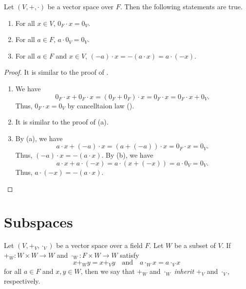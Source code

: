 \begin{theorem}\label{thm:vector-space-multiplication}
  Let $(V, +, \cdot)$ be a vector space over $F$.
  Then the following statements are true.
  \begin{enumerate}
    \item For all $x \in V$, $0_F \cdot x = 0_V$.
    \item For all $a \in F$, $a \cdot 0_V = 0_V$.
    \item For all $a \in F$ and $x \in V$,
      $(-a) \cdot x = -(a \cdot x) = a \cdot (-x)$.
  \end{enumerate}
\end{theorem}
\begin{proof}
  It is similar to the proof of .
  \begin{enumerate}
    \item We have
      $$
      0_F \cdot x + 0_F \cdot x
      = (0_F + 0_F) \cdot x
      = 0_F \cdot x
      = 0_F \cdot x + 0_V.
      $$
      Thus, $0_F \cdot x = 0_V$ by cancelltaion law
      ().
    \item It is similar to the proof of (a).
    \item By (a), we have
      $$
      a \cdot x + (-a) \cdot x
      = (a + (-a)) \cdot x
      = 0_F \cdot x
      = 0_V.
      $$
      Thus, $(-a) \cdot x = -(a \cdot x)$.
      By (b), we have
      $$
      a \cdot x + a \cdot (-x)
      = a \cdot (x + (-x))
      = a \cdot 0_V
      = 0_V.
      $$
      Thus, $a \cdot (-x) = -(a \cdot x)$. \qedhere
  \end{enumerate}
\end{proof}

\section{Subspaces}
\begin{definition}\label{def:inheritance}
  Let $(V, +_V, \cdot_V)$ be a vector space over a field $F$.
  Let $W$ be a subset of $V$.
  If $+_W: W \times W \to W$ and $\cdot_W: F \times W \to W$
  satisfy
  \begin{equation*}
    x +_W y = x +_V y
      \quad \text{and}
      \quad a \cdot_W x = a \cdot_V x
  \end{equation*}
  for all $a \in F$ and $x, y \in W$, then we say that $+_W$ and $\cdot_W$
  \emph{inherit} $+_V$ and $\cdot_V$, respectively.
\end{definition}


